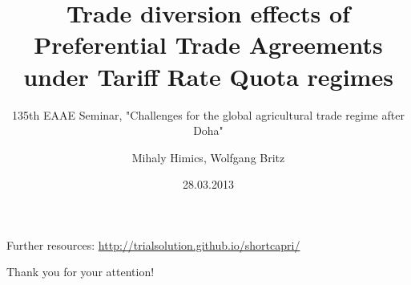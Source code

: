\documentclass[t]{beamer}
\title[Trade diversion effects of PTAs under TRQ regimes]{Trade diversion effects of Preferential Trade Agreements under Tariff Rate Quota regimes}
\subtitle{135th EAAE Seminar, "Challenges for the global agricultural trade regime after Doha"}
\author{Mihaly Himics, Wolfgang Britz}
\institute{Institute for Food and Resource Economics (ILR) University of Bonn}
\date{28.03.2013}
\begin{document}
\begin{frame}
\titlepage
\end{frame}




\begin{frame}
\vspace*{\fill}
{\centering
Further resources: \href{http://trialsolution.github.io/shortcapri/}{http://trialsolution.github.io/shortcapri/}

Thank you for your attention!

}
\vspace*{\fill}
\end{frame}
\end{document}
